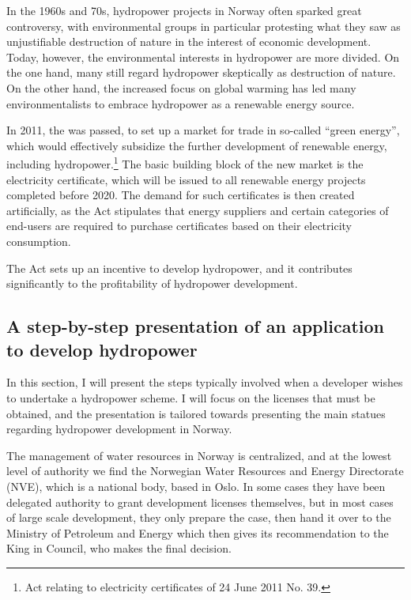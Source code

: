 In the 1960s and 70s, hydropower projects in Norway often sparked great controversy, with environmental groups in particular protesting what they saw as unjustifiable destruction of nature in the interest of economic development. Today, however, the environmental interests in hydropower are more divided. On the one hand, many still regard hydropower skeptically as destruction of nature. On the other hand, the increased focus on global warming has led many environmentalists to embrace hydropower as a renewable energy source.

In 2011, the \cite{eca11} was passed, to set up a market for trade in so-called ``green energy'', which would effectively subsidize the further development of renewable energy, including hydropower.\footnote{Act relating to electricity certificates of
24 June 2011 No. 39.} The basic building block of the new market is the electricity certificate, which will be issued to all renewable energy projects completed before 2020. The demand for such certificates is then created artificially, as the Act stipulates that energy suppliers and certain categories of end-users are required to purchase certificates based on their electricity consumption. 

The Act sets up an incentive to develop hydropower, and it contributes significantly to the profitability of hydropower development.

\subsection{A step-by-step presentation of an application to develop hydropower}

In this section, I will present the steps typically involved when a developer wishes to undertake a hydropower scheme. I will focus on the licenses that must be obtained, and the presentation is tailored towards presenting the main statues regarding hydropower development in Norway. 

The management of water resources in Norway is centralized, and at the lowest level of authority we find the Norwegian Water Resources and Energy Directorate (NVE), which is a national body, based in Oslo. In some cases they have been delegated authority to grant development licenses themselves, but in most cases of large scale development, they only prepare the case, then hand it over to the Ministry of Petroleum and Energy which then gives its recommendation to the King in Council, who makes the final decision. 


